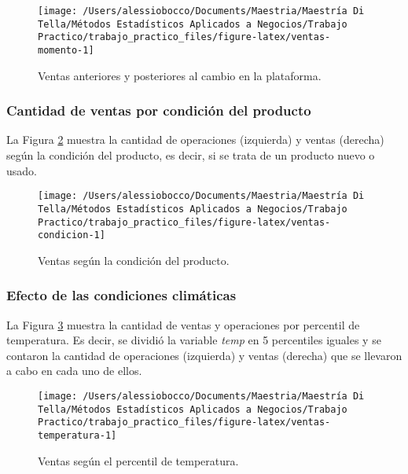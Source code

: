 \documentclass[
  12pt]{article}
\begin{document}
\begin{figure}

{\centering \texttt{[image: /Users/alessiobocco/Documents/Maestria/Maestría Di Tella/Métodos Estadísticos Aplicados a Negocios/Trabajo Practico/trabajo\_practico\_files/figure-latex/ventas-momento-1]} 

}

\caption{Ventas anteriores y posteriores al cambio en la plataforma.}\label{fig:ventas-momento}
\end{figure}

\hypertarget{cantidad-de-ventas-por-condiciuxf3n-del-producto}{%
\subsubsection{Cantidad de ventas por condición del producto}\label{cantidad-de-ventas-por-condiciuxf3n-del-producto}}

La Figura \ref{fig:ventas-condicion} muestra la cantidad de operaciones (izquierda) y ventas (derecha) según la condición del producto, es decir, si se trata de un producto nuevo o usado.

\begin{figure}

{\centering \texttt{[image: /Users/alessiobocco/Documents/Maestria/Maestría Di Tella/Métodos Estadísticos Aplicados a Negocios/Trabajo Practico/trabajo\_practico\_files/figure-latex/ventas-condicion-1]} 

}

\caption{Ventas según la condición del producto.}\label{fig:ventas-condicion}
\end{figure}

\hypertarget{efecto-de-las-condiciones-climuxe1ticas}{%
\subsubsection{Efecto de las condiciones climáticas}\label{efecto-de-las-condiciones-climuxe1ticas}}

La Figura \ref{fig:ventas-temperatura} muestra la cantidad de ventas y operaciones por percentil de temperatura. Es decir, se dividió la variable \emph{temp} en 5 percentiles iguales y se contaron la cantidad de operaciones (izquierda) y ventas (derecha) que se llevaron a cabo en cada uno de ellos.

\begin{figure}

{\centering \texttt{[image: /Users/alessiobocco/Documents/Maestria/Maestría Di Tella/Métodos Estadísticos Aplicados a Negocios/Trabajo Practico/trabajo\_practico\_files/figure-latex/ventas-temperatura-1]} 

}

\caption{Ventas según el percentil de temperatura.}\label{fig:ventas-temperatura}
\end{figure}
\end{document}
